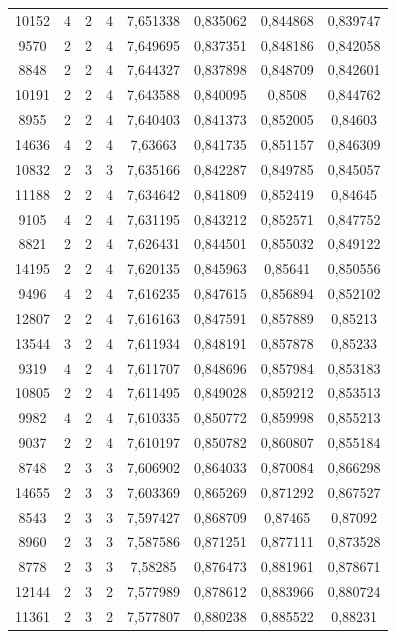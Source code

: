 \begin{longtable}{|c|c|c|c|c|c|c|c|}
10152 & 4 & 2 & 4 & 7,651338 & 0,835062 & 0,844868 & 0,839747 \\
9570 & 2 & 2 & 4 & 7,649695 & 0,837351 & 0,848186 & 0,842058 \\
8848 & 2 & 2 & 4 & 7,644327 & 0,837898 & 0,848709 & 0,842601 \\
10191 & 2 & 2 & 4 & 7,643588 & 0,840095 & 0,8508 & 0,844762 \\
8955 & 2 & 2 & 4 & 7,640403 & 0,841373 & 0,852005 & 0,84603 \\
14636 & 4 & 2 & 4 & 7,63663 & 0,841735 & 0,851157 & 0,846309 \\
10832 & 2 & 3 & 3 & 7,635166 & 0,842287 & 0,849785 & 0,845057 \\
11188 & 2 & 2 & 4 & 7,634642 & 0,841809 & 0,852419 & 0,84645 \\
9105 & 4 & 2 & 4 & 7,631195 & 0,843212 & 0,852571 & 0,847752 \\
8821 & 2 & 2 & 4 & 7,626431 & 0,844501 & 0,855032 & 0,849122 \\
14195 & 2 & 2 & 4 & 7,620135 & 0,845963 & 0,85641 & 0,850556 \\
9496 & 4 & 2 & 4 & 7,616235 & 0,847615 & 0,856894 & 0,852102 \\
12807 & 2 & 2 & 4 & 7,616163 & 0,847591 & 0,857889 & 0,85213 \\
13544 & 3 & 2 & 4 & 7,611934 & 0,848191 & 0,857878 & 0,85233 \\
9319 & 4 & 2 & 4 & 7,611707 & 0,848696 & 0,857984 & 0,853183 \\
10805 & 2 & 2 & 4 & 7,611495 & 0,849028 & 0,859212 & 0,853513 \\
9982 & 4 & 2 & 4 & 7,610335 & 0,850772 & 0,859998 & 0,855213 \\
9037 & 2 & 2 & 4 & 7,610197 & 0,850782 & 0,860807 & 0,855184 \\
8748 & 2 & 3 & 3 & 7,606902 & 0,864033 & 0,870084 & 0,866298 \\
14655 & 2 & 3 & 3 & 7,603369 & 0,865269 & 0,871292 & 0,867527 \\
8543 & 2 & 3 & 3 & 7,597427 & 0,868709 & 0,87465 & 0,87092 \\
8960 & 2 & 3 & 3 & 7,587586 & 0,871251 & 0,877111 & 0,873528 \\
8778 & 2 & 3 & 3 & 7,58285 & 0,876473 & 0,881961 & 0,878671 \\
12144 & 2 & 3 & 2 & 7,577989 & 0,878612 & 0,883966 & 0,880724 \\
11361 & 2 & 3 & 2 & 7,577807 & 0,880238 & 0,885522 & 0,88231 \\

\end{longtable}
